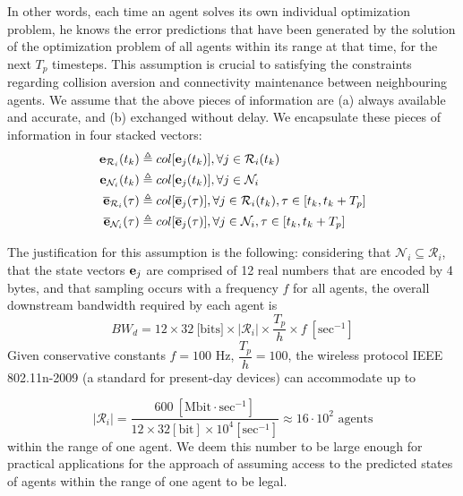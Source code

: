 In other words, each time an agent solves its own individual
optimization problem, he knows the error predictions that have been generated
by the solution of the optimization problem of all agents within
its range at that time, for the next $T_p$ timesteps. This assumption is
crucial to satisfying the constraints regarding collision aversion and
connectivity maintenance between neighbouring agents.
We assume that the above pieces of information are (a) always available and
accurate, and (b) exchanged without delay. We encapsulate these pieces of
information in four stacked vectors:
\begin{subequations}
\begin{align}
  \bm{\mathbf{e}}_{\mathcal{R}_i}(t_k) &\triangleq col[\bm{\mathbf{e}}_j(t_k)], \forall j \in \mathcal{R}_i(t_k) \\
  \bm{\mathbf{e}}_{\mathcal{N}_i}(t_k) &\triangleq col[\bm{\mathbf{e}}_j(t_k)], \forall j \in \mathcal{N}_i \\
  \overline{\bm{\mathbf{e}}}_{\mathcal{R}_i}(\tau) &\triangleq col[\overline{\bm{\mathbf{e}}}_j(\tau)], \forall j \in \mathcal{R}_i(t_k), \tau \in [t_k, t_k + T_p] \\
  \overline{\bm{\mathbf{e}}}_{\mathcal{N}_i}(\tau) &\triangleq col[\overline{\bm{\mathbf{e}}}_j(\tau)], \forall j \in \mathcal{N}_i, \tau \in [t_k, t_k + T_p]
\end{align}
\end{subequations}

\begin{gg_box}
The justification for this assumption is the following: considering that
$\mathcal{N}_i \subseteq \mathcal{R}_i$, that the state
vectors $\bm{\mathbf{e}}_j$ are comprised of 12 real numbers that are encoded by
4 bytes, and that sampling occurs with a frequency $f$ for all agents, the
overall downstream bandwidth required by each agent is
$$BW_d = 12 \times 32\ \text{[bits]} \times |\mathcal{R}_i| \times \dfrac{T_p}{h} \times f\ [\text{sec}^{-1}]$$
Given conservative constants $f = 100$ Hz, $\dfrac{T_p}{h} = 100$, the
wireless protocol IEEE 802.11n-2009 (a standard for present-day devices)
can accommodate up to

$$|\mathcal{R}_i| = \dfrac{600\ [\text{Mbit}\cdot \text{sec}^{-1}] }{12\times32[\text{bit}]\times10^4 [\text{sec}^{-1}]} \approx
16 \cdot 10^2 \text{ agents}$$ within the range of one agent.
We deem this number to be large enough for practical applications
for the approach of assuming access to the predicted states of agents
within the range of one agent to be legal.
\end{gg_box}

